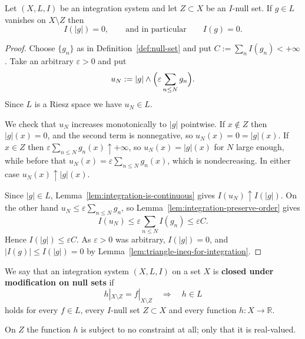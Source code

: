 \begin{lemma}\label{lem:vanish-off-null-set}
  Let $(X,L,I)$ be an integration system and let $Z\subset X$ be an $I$-null set.
  If $g\in L$ vanishes on $X\setminus Z$ then
  \[
    I(|g|)=0,
    \qquad\text{and in particular}\qquad
    I(g)=0 .
  \]
\end{lemma}
\begin{proof}
  Choose $\{g_n\}$ as in Definition~\ref{def:null-set} and put
  $C:=\sum_nI(g_n)<+\infty$.
  Take an arbitrary $\varepsilon>0$ and put
  \[
    u_N:=|g|\land\Bigl(\varepsilon\sum_{n\le N}g_n\Bigr) .
  \]
  Since $L$ is a Riesz space we have $u_N\in L$.

  We check that $u_N$ increases monotonically to $|g|$ pointwise.
  If $x\notin Z$ then $|g|(x)=0$, and the second term is nonnegative, so
  $u_N(x)=0=|g|(x)$.
  If $x\in Z$ then $\varepsilon\sum_{n\le N}g_n(x)\uparrow+\infty$, so
  $u_N(x)=|g|(x)$ for $N$ large enough, while before that
  $u_N(x)=\varepsilon\sum_{n\le N}g_n(x)$, which is nondecreasing.
  In either case $u_N(x)\uparrow|g|(x)$.

  Since $|g|\in L$, Lemma~\ref{lem:integration-is-continuous} gives
  $I(u_N)\uparrow I(|g|)$.
  On the other hand $u_N\le\varepsilon\sum_{n\le N}g_n$, so
  Lemma~\ref{lem:integration-preserve-order} gives
  \[
    I(u_N)\le\varepsilon\sum_{n\le N}I(g_n)\le\varepsilon C.
  \]
  Hence $I(|g|)\le\varepsilon C$. As $\varepsilon>0$ was arbitrary, $I(|g|)=0$,
  and $|I(g)|\le I(|g|)=0$ by
  Lemma~\ref{lem:triangle-ineq-for-integration}.
\end{proof}

\begin{definition}\label{def:mod-closed}
  We say that an integration system $(X,L,I)$ on a set $X$ is
  \textbf{closed under modification on null sets} if
  \[
    h|_{X\setminus Z}=f|_{X\setminus Z}
    \quad\Longrightarrow\quad
    h\in L
  \]
  holds for every $f\in L$, every $I$-null set $Z\subset X$ and every function
  $h:X\to\mathbb{R}$.
\end{definition}

\noindent
On $Z$ the function $h$ is subject to no constraint at all; only that it is
real-valued.


